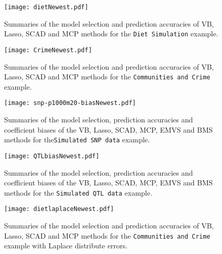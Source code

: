\documentclass[11pt]{article}
\newtheorem{Main Result}{Main Result}
\newcommand{\joc}[1]{{\color{black}#1}}
\begin{document}
\begin{figure}[h]
	\centering
	\texttt{[image: dietNewest.pdf]}
	\caption{Summaries of the model selection and prediction accuracies of VB, Lasso,
		SCAD and MCP methods for the {\tt Diet Simulation} example.}
	\label{fig:03}
\end{figure}



\begin{figure}[h]
	\centering
	\texttt{[image: CrimeNewest.pdf]}
	\caption{\joc{Summaries of the model selection and prediction accuracies of VB, Lasso,
			SCAD and MCP methods for the {\tt Communities and Crime} example.}}
	\label{fig:04}
\end{figure}


\begin{figure}[h]
	\centering
	\texttt{[image: snp-p1000m20-biasNewest.pdf]}
	\caption{Summaries of the model selection, prediction accuracies and coefficient
		biases of the  VB, Lasso,
		SCAD, MCP, EMVS and BMS methods for the{\tt Simulated SNP data} example.}
	\label{fig:05}
\end{figure}



\begin{figure}[h]
	\centering
	\texttt{[image: QTLbiasNewest.pdf]}
	\caption{Summaries of the model selection, prediction accuracies and coefficient
		biases of the  VB, Lasso,
		SCAD, MCP, EMVS and BMS methods for the {\tt Simulated QTL data} example.}
	\label{fig:06}
\end{figure}







\begin{figure}[h]
	\centering
	\texttt{[image: dietlaplaceNewest.pdf]}
	\caption{Summaries of the model selection and prediction accuracies of VB, Lasso,
		SCAD and MCP methods for the {\tt Communities and Crime} example with Laplace
		distribute errors.}
	\label{fig:07}
\end{figure}
\end{document}
